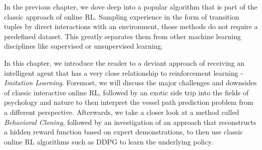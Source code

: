 In the previous chapter, we dove deep into a popular algorithm that is part of the classic approach of online RL. Sampling experience in the form of transition tuples by direct interactions with an environment, those methods do not require a predefined dataset. This greatly separates them from other machine learning disciplines like supervised or unsupervised learning.
\par 
In this chapter, we introduce the reader to a deviant approach of receiving an intelligent agent that has a very close relationship to reinforcement learning - \textit{Imitation Learning}. Foremost, we will discuss the major challenges and downsides of classic interactive online RL, followed by an exotic side trip into the fields of psychology and nature to then interpret the vessel path prediction problem from a different perspective. Afterwards, we take a closer look at a method called \textit{Behavioral Cloning}, followed by an investigation of an approach that reconstructs a hidden reward function based on expert demonstrations, to then use classic online RL algorithms such as DDPG to learn the underlying policy. 